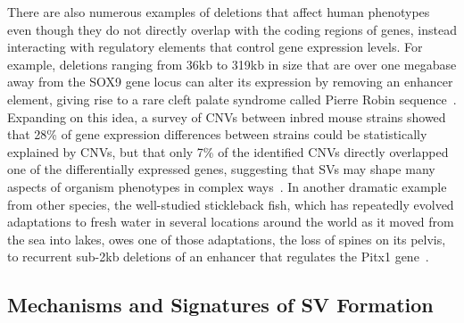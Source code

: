 There are also numerous examples of deletions that affect human phenotypes even though they do not directly overlap with the coding regions of genes, instead interacting with regulatory elements that control gene expression levels. For example, deletions ranging from 36kb to 319kb in size that are over one megabase away from the SOX9 gene locus can alter its expression by removing an enhancer element, giving rise to a rare cleft palate syndrome called Pierre Robin sequence~\cite{Benko:2009dq}. Expanding on this idea, a survey of CNVs between inbred mouse strains showed that 28\% of gene expression differences between strains could be statistically explained by CNVs, but that only 7\% of the identified CNVs directly overlapped one of the differentially expressed genes, suggesting that SVs may shape many aspects of organism phenotypes in complex ways~\cite{Cahan:2009ef}. In another dramatic example from other species, the well-studied stickleback fish, which has repeatedly evolved adaptations to fresh water in several locations around the world as it moved from the sea into lakes, owes one of those adaptations, the loss of spines on its pelvis, to recurrent sub-2kb deletions of an enhancer that regulates the Pitx1 gene~\cite{Chan:2010hz}.


\subsection{Mechanisms and Signatures of SV Formation}\label{section_sv_mechanisms}

